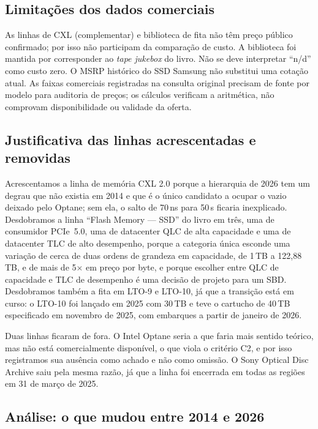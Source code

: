\documentclass[11pt,a4paper]{article}
\begin{document}
\subsection{Limitações dos dados comerciais}

As linhas de CXL (complementar) e biblioteca de fita não têm preço público confirmado;
por isso não participam da comparação de custo. A biblioteca foi mantida por corresponder
ao \textit{tape jukebox} do livro. Não se deve interpretar ``n/d'' como custo zero.
O MSRP histórico do SSD Samsung não substitui uma cotação atual. As faixas comerciais
registradas na consulta original precisam de fonte por modelo para auditoria de preços;
os cálculos verificam a aritmética, não comprovam disponibilidade ou validade da oferta.

\subsection{Justificativa das linhas acrescentadas e removidas}

Acrescentamos a linha de memória CXL 2.0 porque a hierarquia de 2026 tem um degrau que não
existia em 2014 e que é o único candidato a ocupar o vazio deixado pelo Optane; sem ela, o salto de
70\,ns para 50\,\textmu s ficaria inexplicado. Desdobramos a linha ``Flash Memory --- SSD'' do livro
em três, uma de consumidor PCIe~5.0, uma de datacenter QLC de alta capacidade e uma de datacenter TLC
de alto desempenho, porque a categoria única esconde uma variação de cerca de duas ordens de grandeza
em capacidade, de 1\,TB a 122,88\,TB, e de mais de 5$\times$ em preço por byte, e porque escolher
entre QLC de capacidade e TLC de desempenho é uma decisão de projeto para um SBD. Desdobramos também
a fita em LTO-9 e LTO-10, já que a transição está em curso: o LTO-10 foi lançado em 2025 com 30\,TB e
teve o cartucho de 40\,TB especificado em novembro de 2025, com embarques a partir de janeiro de 2026.

Duas linhas ficaram de fora. O Intel Optane seria a que faria mais sentido teórico, mas não está
comercialmente disponível, o que viola o critério C2, e por isso registramos sua ausência como achado
e não como omissão. O Sony Optical Disc Archive saiu pela mesma razão, já que a linha foi encerrada em
todas as regiões em 31 de março de 2025.

\subsection{Análise: o que mudou entre 2014 e 2026}
\end{document}
